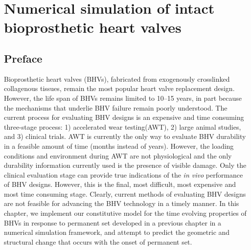 \chapter{Numerical simulation of intact bioprosthetic heart valves}

\section*{Preface}
%

  Bioprosthetic heart valves (BHVs), fabricated from exogenously crosslinked collagenous tissues, remain the most popular heart valve replacement design. However, the life span of BHVs remains limited to 10–15 years, in part because the mechanisms that underlie BHV failure remain poorly understood. The current process for evaluating BHV designs is an expensive and time consuming three-stage process: 1) accelerated wear testing(AWT), 2) large animal studies, and 3) clinical trials. AWT is currently the only way to evaluate BHV durability in a feasible amount of time (months instead of years). However, the loading conditions and environment during AWT are not physiological and the only durability information currently used is the presence of visible damage. Only the clinical evaluation stage can provide true indications of the \textit{in vivo} performance of BHV designs. However, this is the final, most difficult, most expensive and most time consuming stage. Clearly, current methods of evaluating BHV designs are not feasible for advancing the BHV technology in a timely manner. In this chapter, we implement our constitutive model for the time evolving properties of BHVs in response to permanent set developed in a previous chapter in a numerical simulation framework, and attempt to predict the geometric and structural change that occurs with the onset of permanent set. 
















